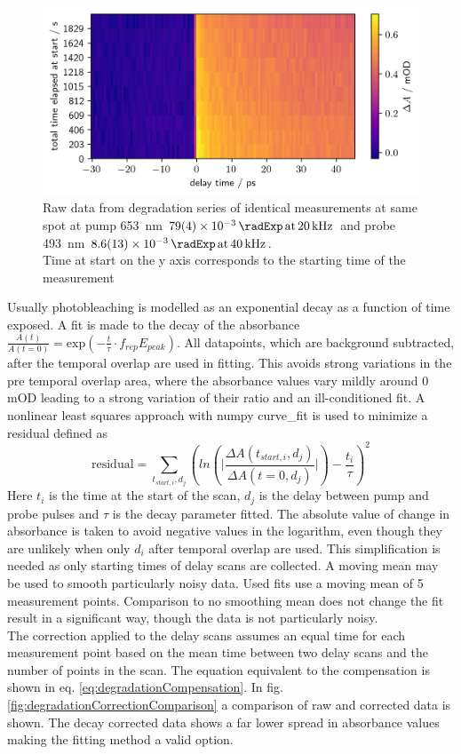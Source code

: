 \documentclass[twoside,openright]{scrreprt}
\def\pumpExp#1{\ensuremath{\SI{#1}{\radExp}\,\mathrm{at}\, \SI{20}{\kilo\hertz}}}
\def\probeExp#1{\ensuremath{\SI{#1}{\radExp}\,\mathrm{at}\, \SI{40}{\kilo\hertz}}}
\begin{document}
{\begin{figure}[hbtp]
\centering
\includegraphics[width=\linewidth]{images/DegradationRAWPump653Probe493.png}
\caption{Raw data from degradation series of identical measurements at same spot at pump \SI{653}{\nano\meter} \pumpExp{79(4)e-3} and probe \SI{493}{\nano\meter} \probeExp{8.6(1.3)e-3}.\\
Time at start on the y axis corresponds to the starting time of the measurement\label{fig:rawDegradation}}
\end{figure}
Usually photobleaching is modelled as an exponential decay as a function of time exposed. A fit is made to the decay of the absorbance $\frac{A\left(t\right)}{A\left(t=0\right)} = \mathrm{exp}\left(-\frac{t}{\tau}\cdot f_{rep}E_{peak}\right)$.
All datapoints, which are background subtracted, after the temporal overlap are used in fitting. This avoids strong variations in the pre temporal overlap area, where the absorbance values vary mildly around 0 mOD leading to a strong variation of their ratio and an ill-conditioned fit. A nonlinear least squares approach with numpy curve\_fit is used to minimize a residual defined as
\begin{equation}\label{eq:degradationFitting}
\mathrm{residual} = \sum_{t_{start,i},d_j} \left(ln\left(\lvert\frac{\Delta A(t_{start,i},d_j)}{\Delta A(t=0,d_j)}\rvert\right)- \frac{t_i}{\tau}\right)^2
\end{equation}
Here $t_i$ is the time at the start of the scan, $d_j$ is the delay between pump and probe pulses and $\tau$ is the decay parameter fitted. The absolute value of change in absorbance is taken to avoid negative values in the logarithm, even though they are unlikely when only $d_i$ after temporal overlap are used.  This simplification is needed as only starting times of delay scans are collected. A moving mean may be used to smooth particularly noisy data. Used fits use a moving mean of 5 measurement points. Comparison to no smoothing mean does not change the fit result in a significant way, though the data is not particularly noisy.\\
The correction applied to the delay scans assumes an equal time for each measurement point based on the mean time between two delay scans and the number of points in the scan. The equation equivalent to the compensation is shown in eq. \ref{eq:degradationCompensation}. In fig. \ref{fig:degradationCorrectionComparison} a comparison of raw and corrected data is shown. The decay corrected data shows a far lower spread in absorbance values making the fitting method a valid option. 

}
\end{document}
